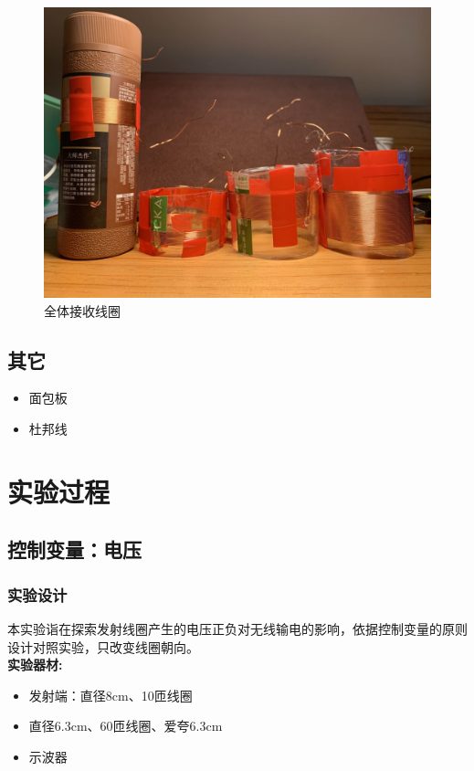 \documentclass[conference]{IEEEtran}
\theoremstyle{break}
\begin{document}
        \begin{figure}[htbp]
                \centerline{\includegraphics[scale=0.1]{接收线圈全家福.png}}
                \caption{全体接收线圈}
                \label{fig}
                \end{figure}
   
\subsection{其它}
\begin{itemize}
        \item 面包板    
        \item 杜邦线
\end{itemize}

\section{实验过程}
\subsection{控制变量：电压}
\subsubsection{实验设计}
本实验诣在探索发射线圈产生的电压正负对无线输电的影响，依据控制变量的原则设计对照实验，只改变线圈朝向。\\
\textbf{实验器材:}
\begin{itemize}
        \item 发射端：直径8cm、10匝线圈
        \item 直径6.3cm、60匝线圈、爱夸6.3cm
        \item 示波器
\end{itemize}
\end{document}
